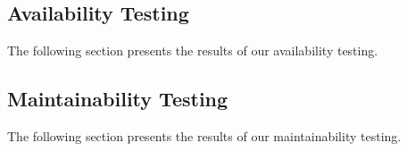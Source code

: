 \documentclass[12pt, titlepage]{article}
\begin{document}
\subsection{Availability Testing}
The following section presents the results of our availability testing.

\begin{table}[H]
  \caption{\bf Availability Testing Evaluation Results}
  \label{table:GR-Availability}
\end{table}

\subsection{Maintainability Testing}
The following section presents the results of our maintainability testing.
\end{document}
